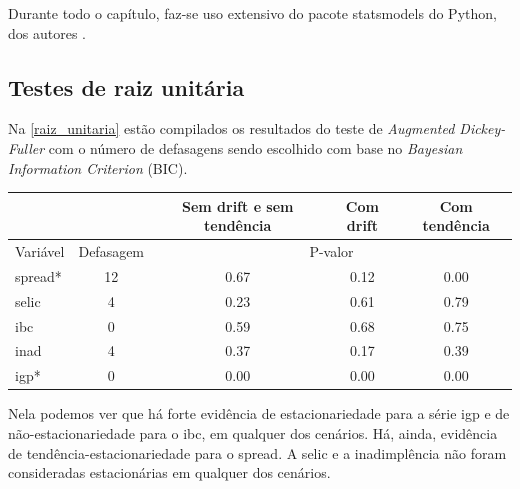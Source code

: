 \documentclass[a4paper,
               article,
               12pt,
               openany,
               oneside,
               english,
               brazil]{abntex2}
\numberwithin{equation}{section}
\begin{document}
   Durante todo o capítulo, faz-se uso extensivo do pacote statsmodels do Python, dos autores \textcite{statsmodels}.

   \subsection{Testes de raiz unitária}
   
   Na \autoref{raiz_unitaria} estão compilados os resultados do teste de \textit{Augmented Dickey-Fuller} com o número de defasagens sendo escolhido com base no \textit{Bayesian Information Criterion} (BIC).

    \begin{table}[ht]
        {%
            \begin{tabular}{lcccc}
                \midrule
                & \multicolumn{1}{c}{} & \multicolumn{1}{C{3cm}}{Sem drift e sem tendência} & \multicolumn{1}{C{3cm}}{Com drift} & \multicolumn{1}{C{3cm}}{Com tendência} \\
                \midrule
                Variável & Defasagem & \multicolumn{3}{c}{P-valor} \\
                \midrule
                spread*      &         12 &     0.67 &     0.12 &     0.00 \\
                selic        &          4 &     0.23 &     0.61 &     0.79 \\
                ibc          &          0 &     0.59 &     0.68 &     0.75 \\
                inad         &          4 &     0.37 &     0.17 &     0.39 \\
                igp*         &          0 &     0.00 &     0.00 &     0.00 \\
                \midrule
            \end{tabular}
            } 
            {}
    \end{table}

    Nela podemos ver que há forte evidência de estacionariedade para a série igp e de não-estacionariedade para o ibc, em qualquer dos cenários. Há, ainda, evidência de tendência-estacionariedade para o spread. A selic e a inadimplência não foram consideradas estacionárias em qualquer dos cenários.
\end{document}
